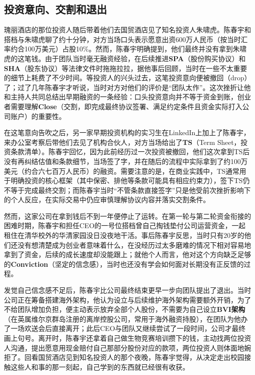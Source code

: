 \documentclass[UTF8,a4paper,11pt,fontset=fandol]{ctexart}
\begin{document}
\subsection{投资意向、交割和退出}
瑰丽酒店的那位投资人随后带着他们去国贸酒店见了知名投资人朱啸虎。陈春宇和搭档与朱啸虎聊了约十分钟，对方当场口头表示愿意出资600万人民币（按当时汇率约合100万美元）占股10\%。然而，陈春宇明确提到，他们最终并没有拿到朱啸虎的这笔钱。由于团队当时毫无融资经验，在后续推进\textbf{SPA}（股份购买协议）和\textbf{SHA}（股东协议）等法律文件时拖拖拉拉，据他事后回顾，当时在一些不太重要的细节上耗费了不少时间。等投资人的兴头过去，这笔投资意向便被撤回（drop）了；过了几年陈春宇才听说，当时对方对他们的评价是“团队太作”。这次挫折让他和主持人共同总结出早期融资的一条经验：口头投资意向并不等于资金到账，创业者需要理解\textbf{Close}（交割，即完成最终协议签署、满足约定条件且资金实际打入公司账户）的重要性。

在这笔意向告吹之后，另一家早期投资机构的实习生在LinkedIn上加上了陈春宇，来办公室考察后带他们去见了机构合伙人，对方当场给出了\textbf{TS}（Term Sheet，投资条款清单）。陈春宇回忆，因为此前经历过一次投资被撤回，他们这次拿到TS后没有再纠结估值和条款细节，当场签了字，并在随后的流程中实际拿到了约100万美元（约合六七百万人民币）的融资。需要注意的是，在商业实践中，TS通常用于明确投资的核心框架（其中保密、排他等条款可能具有相应约束力），签下TS仍不等于完成最终交割；而陈春宇当时“不管条款直接签字”只是他受前次挫折影响下的个人反应，在实际交易中仍应审慎理解协议内容并落实交割条件。

然而，这家公司在拿到钱后不到一年便停止了运转。在第一轮与第二轮资金衔接的困难时期，陈春宇和担任CEO的一号位搭档曾自己掏钱垫付公司运营资金，一起租住在清华校外的华清家园没日没夜地干活。事后陈春宇反思，当时只有20岁的他们还没有想清楚成为创业者意味着什么，在没经历过太多磨难的情况下相对容易地拿到了资金，后续的成长速度却没能跟上；就他个人而言，他对这个方向缺乏足够的\textbf{Conviction}（坚定的信念感），当时也还没有学会如何面对长期没有正反馈的过程。

发觉自己信念感不足后，陈春宇比公司最终结束更早一步向团队提出了退出。当时公司正在筹备搭建海外架构，他认为设立与后续维护海外架构需要额外开销，为了不给团队增加负担，便主动表示放弃全部个人股份，不需要为自己设立\textbf{BVI架构}（在英属维尔京群岛注册的离岸控股公司，常用于海外融资持股），在团队为他办了一场欢送会后直接离开；此后CEO与团队又继续尝试了一段时间，公司才最终画上句号。离开时，陈春宇还拿着自己做生物竞赛培训攒下的钱，主动找两位投资人沟通，提出愿意用现金赔付自己那部分股份对应的款项，两位投资人则体面地婉拒了。回看国贸酒店见到知名投资人的那个夜晚，陈春宇觉得，从决定走出校园接触这些人和事的那一刻起，自己学到的东西就已经很有收获。
\end{document}
